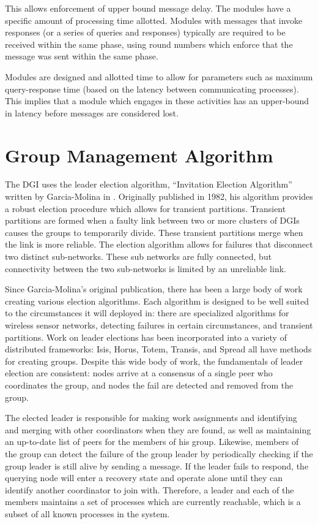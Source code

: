 This allows enforcement of upper bound message delay. The modules have a specific amount of processing time allotted. Modules with messages that invoke responses (or a series of queries and responses) typically are required to be received within the same phase, using round numbers which enforce that the message was sent within the same phase.

Modules are designed and allotted time to allow for parameters such as maximum query-response time (based on the latency between communicating processes).  This implies that a module which engages in these activities has an upper-bound in latency before messages are considered lost.

\section{Group Management Algorithm}

The DGI uses the leader election algorithm, ``Invitation Election Algorithm'' written by Garcia-Molina in \cite{INVITATIONELECTION}. Originally published in 1982, his algorithm provides a robust election procedure which allows for transient partitions. Transient partitions are formed when a faulty link between two or more clusters of DGIs causes the groups to temporarily divide. These transient partitions merge when the link is more reliable. The election algorithm allows for failures that disconnect two distinct sub-networks. These sub networks are fully connected, but connectivity between the two sub-networks is limited by an unreliable link.

Since Garcia-Molina's original publication, there has been a large body of work creating various election algorithms. Each algorithm is designed to be well suited to the circumstances it will deployed in: there are specialized algorithms for wireless sensor networks\cite{LE-WSN-1}\cite{LE-WSN-2}, detecting failures in certain circumstances\cite{LE-SPECIALCIRCUMSTANCES-1}\cite{LE-SPECIALCIRCUMSTANCES-2}, and transient partitions. Work on leader elections has been incorporated into a variety of distributed frameworks: Isis\cite{ISISTOOLKIT}, Horus\cite{HORUSTOOLKIT}, Totem\cite{TOTEMTOOLKIT}, Transis\cite{TRANSISTOOLKIT}, and Spread\cite{SPREADTOOLKIT} all have methods for creating groups. Despite this wide body of work, the fundamentals of leader election are consistent: nodes arrive at a consensus of a single peer who coordinates the group, and nodes the fail are detected and removed from the group.

The elected leader is responsible for making work assignments and identifying and merging with other coordinators when they are found, as well as maintaining an up-to-date list of peers for the members of his group.  Likewise, members of  the group can detect the failure of the group leader by periodically checking  if the group leader is still alive by sending a message. If the leader fails to  respond, the querying node will enter a recovery state and operate alone until  they can identify another coordinator to join with. Therefore, a leader and each of the members maintains a set of processes which are currently reachable, which is a subset of all known processes in the system.

